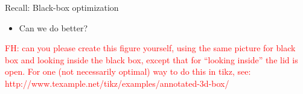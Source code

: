 










\iffalse


\begin{frame}{Recall: Black-box optimization}

\begin{figure}
    \centering
    
\end{figure}
\pause
\begin{itemize}
    \item Can we do better?
\end{itemize}
    
    \textcolor{red}{FH: can you please create this figure yourself, using the same picture for black box and looking inside the black box, except that for ``looking inside'' the lid is open. For one (not necessarily optimal) way to do this in tikz, see: http://www.texample.net/tikz/examples/annotated-3d-box/}
    
\end{frame}




